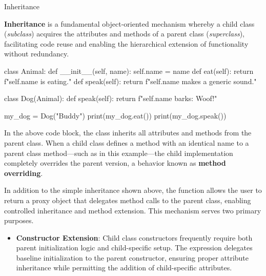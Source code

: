 \documentclass[10pt]{article}
\begin{document}
    \begin{core}[label=core:inheritance]{Inheritance}

      \textbf{Inheritance} is a fundamental object-oriented mechanism whereby a child class (\textit{subclass}) acquires the attributes and methods of a parent class (\textit{superclass}), facilitating code reuse and enabling the hierarchical extension of functionality without redundancy.
      
      \begin{pyconsole}

        class Animal:
            def __init__(self, name):
                self.name = name
            def eat(self):
                return f"{self.name} is eating."
            def speak(self):
                return f"{self.name} makes a generic sound."

        class Dog(Animal):
            def speak(self):
                return f"{self.name} barks: Woof!"

        my_dog = Dog("Buddy")
        print(my_dog.eat())
        print(my_dog.speak())

      \end{pyconsole}
      
      In the above code block, the  class inherits all attributes and methods from the  parent class. When a child class defines a method with an identical name to a parent class method---such as  in this example---the child implementation completely overrides the parent version, a behavior known as \textbf{method overriding}.
      
      In addition to the simple inheritance shown above, the  function allows the user to return a proxy object that delegates method calls to the parent class, enabling controlled inheritance and method extension. This mechanism serves two primary purposes.
      
      \begin{itemize}

        \item \textbf{Constructor Extension}: Child class constructors frequently require both parent initialization logic and child-specific setup. The expression  delegates baseline initialization to the parent constructor, ensuring proper attribute inheritance while permitting the addition of child-specific attributes.
        

\end{itemize}
\end{core}
\end{document}
